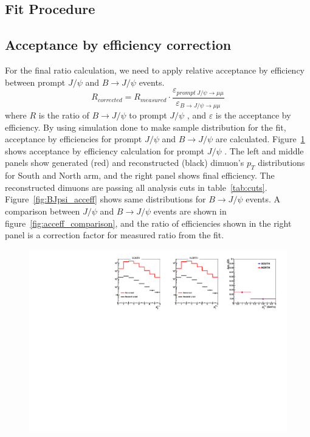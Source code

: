 \documentclass[12pt]{article}
\newcommand{\pt}{$p_{T}$ }
\newcommand{\jpsi}{$J/\psi$ }
\newcommand{\bjpsi}{${B} \to J/\psi$ }
\begin{document}
\subsection{Fit Procedure}
\label{sec:Fit}

\subsection{Acceptance by efficiency correction}
\label{sec:accbyeff}
For the final ratio calculation, we need to apply relative acceptance by efficiency between prompt \jpsi and \bjpsi events.
\begin{equation}
R_{corrected} = R_{measured}\cdot\frac{\varepsilon_{prompt~J/\psi\to\mu\mu}}{\varepsilon_{B\to J/\psi\to\mu\mu}}
\end{equation}
where $R$ is the ratio of \bjpsi to prompt \jpsi, and $\varepsilon$ is the acceptance by efficiency.
By using simulation done to make sample distribution for the fit, acceptance by efficiencies for prompt \jpsi and \bjpsi are calculated.
Figure~\ref{fig:Jpsi_acceff} shows acceptance by efficiency calculation for prompt \jpsi.
The left and middle panels show generated (red) and reconstructed (black) dimuon's \pt distributions for South and North arm, and the right panel shows final efficiency.
The reconstructed dimuons are passing all analysis cuts in table~\ref{tab:cuts}. 
Figure~\ref{fig:BJpsi_acceff} shows same distributions for \bjpsi events.
A comparison between \jpsi and \bjpsi events are shown in figure~\ref{fig:acceff_comparison}, and the ratio of efficiencies shown in the right panel is a correction factor for measured ratio from the fit.

\begin{figure}[!htb]
	\includegraphics[width=1.0\textwidth]{Figures/Run12pp510_Jpsi_acc_eff}
	\caption{}
	\label{fig:Jpsi_acceff}
\end{figure}
\end{document}
